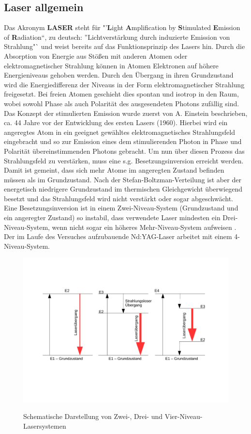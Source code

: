 \documentclass[twoside,colorback,accentcolor=tud4c,11pt]{tudreport}
\begin{document}
\subsection{Laser allgemein}
Das Akronym  \textbf{LASER} steht für "'\textbf{L}ight \textbf{A}mplification by \textbf{S}timulated \textbf{E}mission of \textbf{R}adiation"`, zu deutsch: "'Lichtverstärkung durch induzierte Emission von Strahlung"` und weist bereits auf das Funktionsprinzip des Lasers hin. Durch die Absorption von Energie aus Stößen mit anderen Atomen oder elektromagnetischer Strahlung können in Atomen Elektronen auf höhere Energieniveaus gehoben werden. Durch den Übergang in ihren Grundzustand wird die Energiedifferenz der Niveaus in der Form elektromagnetischer Strahlung freigesetzt. Bei freien Atomen geschieht dies spontan und isotrop in den Raum, wobei sowohl Phase als auch Polarität des ausgesendeten Photons zufällig sind.\\
Das Konzept der stimulierten Emission wurde zuerst von A. Einstein beschrieben, ca. 44 Jahre vor der Entwicklung des ersten Lasers (1960). Hierbei wird ein angeregtes Atom in ein geeignet gewähltes elektromagnetisches Strahlungsfeld eingebracht und so zur Emission eines dem stimulierenden Photon in Phase und Polarität übereinstimmenden Photons gebracht. Um nun über diesen Prozess das Strahlungsfeld zu verstärken, muss eine s.g. Besetzungsinversion erreicht werden. Damit ist gemeint, dass sich mehr Atome im angeregten Zustand befinden müssen als im Grundzustand. Nach der Stefan-Boltzman-Verteilung ist aber der energetisch niedrigere Grundzustand im thermischen Gleichgewicht überwiegend besetzt und das Strahlungsfeld wird nicht verstärkt oder sogar abgeschwächt. Eine Besetzungsinversion ist in einem Zwei-Niveau-System (Grundzustand und ein angeregter Zustand) so instabil, dass verwendete Laser mindesten ein Drei-Niveau-System, wenn nicht sogar ein höheres Mehr-Niveau-System aufweisen \cite{prot1}.\\
Der im Laufe des Versuches aufzubauende Nd:YAG-Laser arbeitet mit einem 4-Niveau-System.
\begin{figure}[H]
\centering
   	\begin{minipage}[b]{0.9\textwidth}
   	\includegraphics[width=\textwidth]{graphics/Lasersys.pdf}
  	\label{lasys}
   	\end{minipage}
\caption{Schematische Darstellung von Zwei-, Drei- und Vier-Niveau-Lasersystemen} 	
\end{figure}
\end{document}
